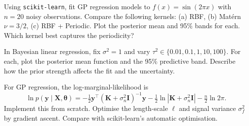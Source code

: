 \begin{exercise}
Using \texttt{scikit-learn}, fit GP regression models to $f(x)=\sin(2\pi x)$ with $n=20$ noisy observations. Compare the following kernels: (a) RBF, (b) Mat\'ern $\nu=3/2$, (c) RBF + Periodic. Plot the posterior mean and 95\% bands for each. Which kernel best captures the periodicity?
\end{exercise}

\begin{exercise}
In Bayesian linear regression, fix $\sigma^2=1$ and vary $\tau^2\in\{0.01,0.1,1,10,100\}$. For each, plot the posterior mean function and the 95\% predictive band. Describe how the prior strength affects the fit and the uncertainty.
\end{exercise}

\begin{exercise}
For GP regression, the log-marginal-likelihood is
\[
  \ln p(\bm{y}\mid\bm{X},\bm{\theta})
  = -\tfrac{1}{2}\bm{y}^\top(\bm{K}+\sigma_n^2\bm{I})^{-1}\bm{y}
  - \tfrac{1}{2}\ln|\bm{K}+\sigma_n^2\bm{I}| - \tfrac{n}{2}\ln 2\pi.
\]
Implement this from scratch. Optimise the length-scale $\ell$ and signal variance $\sigma_f^2$ by gradient ascent. Compare with scikit-learn's automatic optimisation.
\end{exercise}
